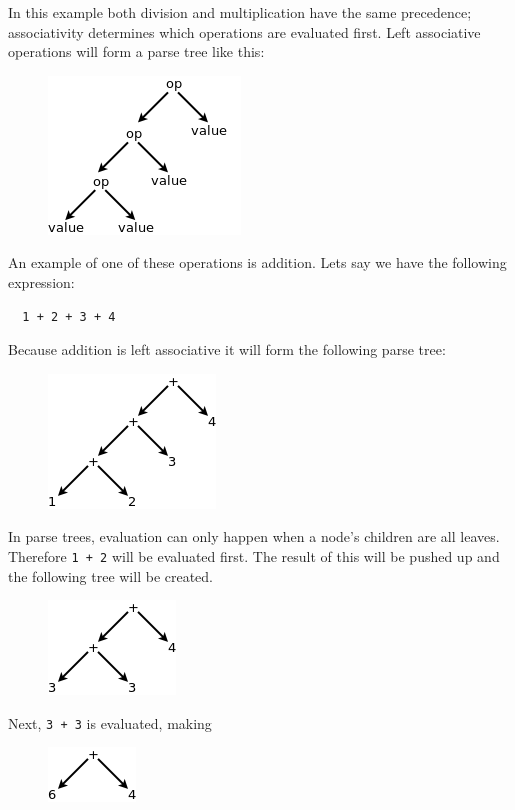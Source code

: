 \documentclass{article}
\newcommand{\code}[1]{\texttt{\textmd{#1}}}
\begin{document}
In this example both division and multiplication have the same precedence; associativity determines
which operations are evaluated first. Left associative operations will form a parse tree like this:
\begin{figure}[H]
  \centering
  \includegraphics{static/left-assoc-gen.png}
\end{figure}

An example of one of these operations is addition. Lets say we have the following expression:
\begin{lstlisting}
  1 + 2 + 3 + 4
\end{lstlisting}

Because addition is left associative it will form the following parse tree:
\begin{figure}[H]
  \centering
  \includegraphics{static/left-assoc-plus.png}
\end{figure}

In parse trees, evaluation can only happen when a node's children are all leaves. Therefore
\code{1 + 2} will be evaluated first. The result of this will be pushed up and the following tree
will be created.
\begin{figure}[H]
  \centering
  \includegraphics{static/left-assoc-plus-2.png}
\end{figure}

Next, \code{3 + 3} is evaluated, making
\begin{figure}[H]
  \centering
  \includegraphics{static/left-assoc-plus-3.png}
\end{figure}
\end{document}
